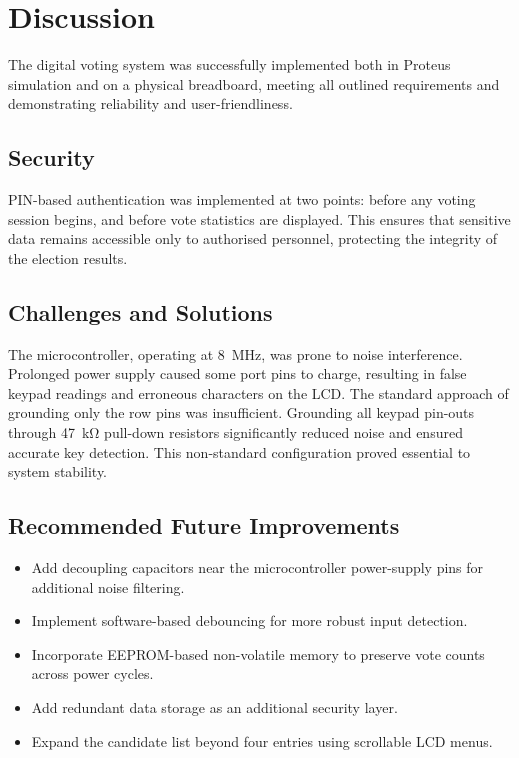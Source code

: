 \documentclass[11pt, a4paper]{report}
\begin{document}
\chapter{Discussion}

The digital voting system was successfully implemented both in Proteus
simulation and on a physical breadboard, meeting all outlined requirements and
demonstrating reliability and user-friendliness.

\section{Security}

PIN-based authentication was implemented at two points: before any voting
session begins, and before vote statistics are displayed. This ensures that
sensitive data remains accessible only to authorised personnel, protecting the
integrity of the election results.

\section{Challenges and Solutions}

The microcontroller, operating at \SI{8}{MHz}, was prone to noise
interference. Prolonged power supply caused some port pins to charge,
resulting in false keypad readings and erroneous characters on the LCD. The
standard approach of grounding only the row pins was insufficient. Grounding
all keypad pin-outs through \SI{47}{\kilo\ohm} pull-down resistors
significantly reduced noise and ensured accurate key detection. This
non-standard configuration proved essential to system stability.

\section{Recommended Future Improvements}

\begin{itemize}
    \item Add decoupling capacitors near the microcontroller power-supply
          pins for additional noise filtering.
    \item Implement software-based debouncing for more robust input
          detection.
    \item Incorporate EEPROM-based non-volatile memory to preserve vote
          counts across power cycles.
    \item Add redundant data storage as an additional security layer.
    \item Expand the candidate list beyond four entries using scrollable
          LCD menus.
\end{itemize}
\end{document}
